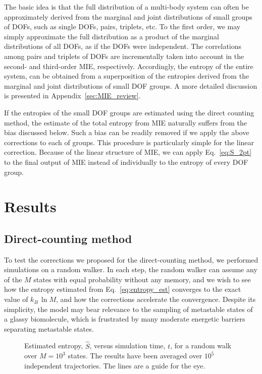 \documentclass[reprint, superscriptaddress]{revtex4-1}
\begin{document}
The basic idea is that the full distribution of a multi-body system
can often be approximately derived
from the marginal and joint distributions of small groups of DOFs,
such as single DOFs, pairs, triplets, etc.
%
To the first order,
we may simply approximate the full distribution as a product
of the marginal distributions of all DOFs,
as if the DOFs were independent.
%
The correlations among pairs and triplets of DOFs
are incrementally taken into account in the second- and third-order MIE,
respectively.
%
Accordingly, the entropy of the entire system,
can be obtained from a superposition of the entropies
derived from the marginal and joint distributions
of small DOF groups.
%
A more detailed discussion is presented in Appendix~\ref{sec:MIE_review}.

If the entropies of the small DOF groups are estimated
using the direct counting method,
the estimate of the total entropy from MIE
naturally suffers from the bias discussed below.
%
Such a bias can be readily removed
if we apply the above corrections
to each of groups.
%
This procedure is particularly simple for the linear correction.
%
Because of the linear structure of MIE,
we can apply Eq.~\eqref{eq:S_2pt}
to the final output of MIE
instead of individually to the entropy of every DOF group.



\section{Results}

\subsection{Direct-counting method}

To test the corrections we proposed for the direct-counting method,
we performed simulations on a random walker.
%
In each step, the random walker can assume any of the $M$ states
with equal probability without any memory,
and we wish to see how the entropy estimated
from Eq.~\eqref{eq:entropy_est} converges to the exact value of $k_B \, \ln M$,
and how the corrections accelerate the convergence.
%
Despite its simplicity, the model may bear relevance
to the sampling of metastable states of a glassy biomolecule,
which is frustrated by many moderate energetic barriers
separating metastable states.

\begin{figure}[h]\centering
  \caption{
    \label{fig:walk_q1e3}
    Estimated entropy, $\hat S$,
    versus simulation time, $t$, for a random walk over $M = 10^3$ states.
    The results have been averaged over $10^5$ independent trajectories.
    The lines are a guide for the eye.
  }
\end{figure}
\end{document}

